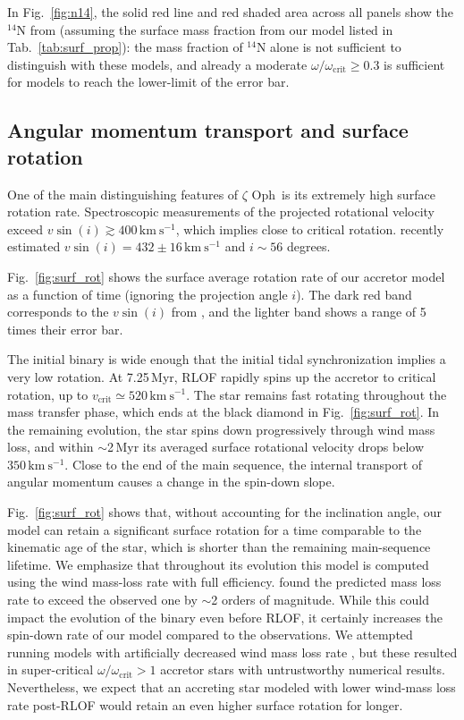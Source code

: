 \documentclass[twocolumn,twocolappendix,trackchanges]{aastex63}
\newcommand{\kms}{{\mathrm{km\ s^{-1}}}}
\DeclareRobustCommand{\Figref}[1]{Fig.~\ref{#1}}
\DeclareRobustCommand{\Tabref}[1]{Tab.~\ref{#1}}
\newcommand{\zoph}{$\zeta$ Oph}
\begin{document}
In \Figref{fig:n14}, the solid red line and red shaded area across all panels show the
$^{14}\mathrm{N}$ from  (assuming the
surface mass fraction from our model listed in \Tabref{tab:surf_prop}): the mass fraction of $^{14}\mathrm{N}$
alone is not sufficient to distinguish with these models, and already
a moderate $\omega/\omega_\mathrm{crit}\geq0.3$ is sufficient for
models to reach the lower-limit of the error bar.


\subsection{Angular momentum transport and surface rotation}
\label{sec:rot}

One of the main distinguishing features of \zoph\ is its extremely
high surface rotation rate. Spectroscopic measurements of the
projected rotational velocity exceed $v\sin(i)\gtrsim 400\,\kms$,
which implies close to critical rotation. \cite{zehe:18} recently
estimated $v\sin(i)=432\pm16\,\kms$ and $i\sim56$ degrees.

\Figref{fig:surf_rot} shows the surface average rotation rate of our
accretor model as a function of time (ignoring the projection angle
$i$). The dark red band corresponds to the $v\sin(i)$ from
\cite{zehe:18}, and the lighter band shows a range of 5 times their
error bar.

The initial binary is wide enough that the initial tidal
synchronization implies a very low rotation. At 7.25\,Myr, RLOF
rapidly spins up the accretor to critical rotation, up to
$v_\mathrm{crit}\simeq520\,\kms$. The star remains fast rotating
throughout the mass transfer phase, which ends at the black diamond in
\Figref{fig:surf_rot}. In the remaining evolution, the star spins down
progressively through wind mass loss, and within $\sim$2\,Myr its
averaged surface rotational velocity drops below $350\,\kms$. Close to
the end of the main sequence, the internal transport of angular
momentum causes a change in the spin-down slope.

\Figref{fig:surf_rot} shows that, without accounting for the
inclination angle, our model can retain a significant surface rotation
for a time comparable to the kinematic age of the star, which is
shorter than the remaining main-sequence lifetime.  We emphasize that
throughout its evolution this model is computed using the
\cite{vink:00, vink:01} wind mass-loss rate with full
efficiency. \cite{marcolino:09} found the predicted mass loss rate to
exceed the observed one by $\sim$2 orders of magnitude. While this
could impact the evolution of the binary even before RLOF, it
certainly increases the spin-down rate of our model compared to the
observations. We attempted running models with artificially decreased
wind mass loss rate \citep[e.g.,][]{renzo:17}, but these resulted in
super-critical $\omega/\omega_\mathrm{crit}>1$ accretor stars with
untrustworthy numerical results. Nevertheless, we expect that an
accreting star modeled with lower wind-mass loss rate post-RLOF would
retain an even higher surface rotation for longer.
\end{document}
